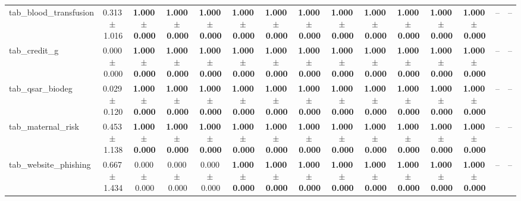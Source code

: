 \documentclass[8pt]{extarticle}
\begin{document}
\begin{longtable}{l*{14}{c}}
tab\_blood\_transfusion & 0.313\,$\pm$\,1.016 & \textbf{1.000\,$\pm$\,0.000} & \textbf{1.000\,$\pm$\,0.000} & \textbf{1.000\,$\pm$\,0.000} & \textbf{1.000\,$\pm$\,0.000} & \textbf{1.000\,$\pm$\,0.000} & \textbf{1.000\,$\pm$\,0.000} & \textbf{1.000\,$\pm$\,0.000} & \textbf{1.000\,$\pm$\,0.000} & \textbf{1.000\,$\pm$\,0.000} & \textbf{1.000\,$\pm$\,0.000} & \textbf{1.000\,$\pm$\,0.000} & -- & -- \\
tab\_credit\_g & 0.000\,$\pm$\,0.000 & \textbf{1.000\,$\pm$\,0.000} & \textbf{1.000\,$\pm$\,0.000} & \textbf{1.000\,$\pm$\,0.000} & \textbf{1.000\,$\pm$\,0.000} & \textbf{1.000\,$\pm$\,0.000} & \textbf{1.000\,$\pm$\,0.000} & \textbf{1.000\,$\pm$\,0.000} & \textbf{1.000\,$\pm$\,0.000} & \textbf{1.000\,$\pm$\,0.000} & \textbf{1.000\,$\pm$\,0.000} & \textbf{1.000\,$\pm$\,0.000} & -- & -- \\
tab\_qsar\_biodeg & 0.029\,$\pm$\,0.120 & \textbf{1.000\,$\pm$\,0.000} & \textbf{1.000\,$\pm$\,0.000} & \textbf{1.000\,$\pm$\,0.000} & \textbf{1.000\,$\pm$\,0.000} & \textbf{1.000\,$\pm$\,0.000} & \textbf{1.000\,$\pm$\,0.000} & \textbf{1.000\,$\pm$\,0.000} & \textbf{1.000\,$\pm$\,0.000} & \textbf{1.000\,$\pm$\,0.000} & \textbf{1.000\,$\pm$\,0.000} & \textbf{1.000\,$\pm$\,0.000} & -- & -- \\
tab\_maternal\_risk & 0.453\,$\pm$\,1.138 & \textbf{1.000\,$\pm$\,0.000} & \textbf{1.000\,$\pm$\,0.000} & \textbf{1.000\,$\pm$\,0.000} & \textbf{1.000\,$\pm$\,0.000} & \textbf{1.000\,$\pm$\,0.000} & \textbf{1.000\,$\pm$\,0.000} & \textbf{1.000\,$\pm$\,0.000} & \textbf{1.000\,$\pm$\,0.000} & \textbf{1.000\,$\pm$\,0.000} & \textbf{1.000\,$\pm$\,0.000} & \textbf{1.000\,$\pm$\,0.000} & -- & -- \\
tab\_website\_phishing & 0.667\,$\pm$\,1.434 & 0.000\,$\pm$\,0.000 & 0.000\,$\pm$\,0.000 & 0.000\,$\pm$\,0.000 & \textbf{1.000\,$\pm$\,0.000} & \textbf{1.000\,$\pm$\,0.000} & \textbf{1.000\,$\pm$\,0.000} & \textbf{1.000\,$\pm$\,0.000} & \textbf{1.000\,$\pm$\,0.000} & \textbf{1.000\,$\pm$\,0.000} & \textbf{1.000\,$\pm$\,0.000} & \textbf{1.000\,$\pm$\,0.000} & -- & -- \\
\end{longtable}
\end{document}
